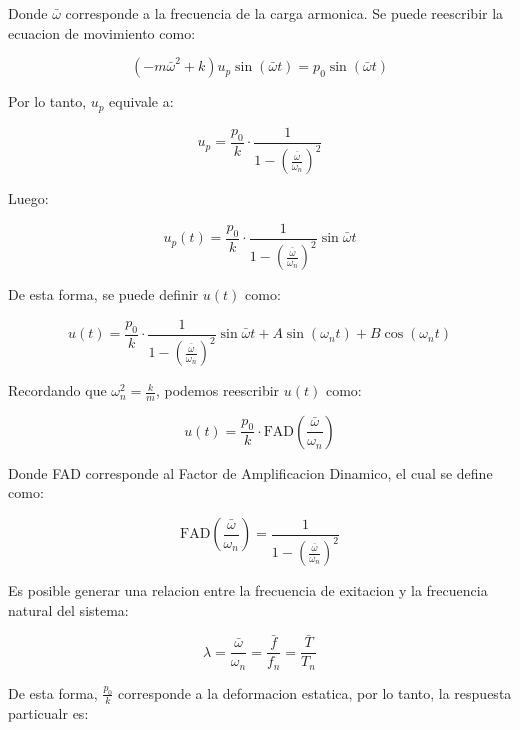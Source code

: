 \documentclass{article}  %
\begin{document}
Donde $\bar{\omega}$ corresponde a la frecuencia de la carga armonica. Se puede reescribir la ecuacion de movimiento como:

\begin{equation}
    (-m \bar{\omega}^2 + k)u_p \sin(\bar{\omega} t ) = p_0 \sin(\bar{\omega} t )
\end{equation}

Por lo tanto, $u_p$ equivale a:

\begin{equation}
    u_p = \frac{p_0}{k} \cdot \frac{1}{1-(\frac{\bar{\omega}}{\omega_n})^2}
\end{equation}

Luego:

\begin{equation}
    u_p(t) = \frac{p_0}{k} \cdot \frac{1}{1-(\frac{\bar{\omega}}{\omega_n})^2} \sin{\bar{\omega} t }
\end{equation}

De esta forma, se puede definir $u(t)$ como:

\begin{equation}
    u(t) = \frac{p_0}{k} \cdot \frac{1}{1-(\frac{\bar{\omega}}{\omega_n})^2} \sin{\bar{\omega} t } + A \sin(\omega_n t) + B \cos(\omega_n t)
\end{equation}

Recordando que $\omega_n^2 = \frac{k}{m}$, podemos reescribir $u(t)$ como:

\begin{equation}
    u(t) = \frac{p_0}{k} \cdot \text{FAD}(\frac{\bar\omega}{\omega_n})
\end{equation}

Donde FAD corresponde al Factor de Amplificacion Dinamico, el cual se define como:

\begin{equation}
    \text{FAD}(\frac{\bar\omega}{\omega_n}) = \frac{1}{1-(\frac{\bar{\omega}}{\omega_n})^2}
\end{equation}

Es posible generar una relacion entre la frecuencia de exitacion y la frecuencia natural del sistema:

\begin{equation}
    \lambda = \frac{\bar{\omega}}{\omega_n} = \frac{\bar{f}}{f_n} = \frac{\bar{T}}{T_n}
\end{equation}

De esta forma, $\frac{p_0}{k}$ corresponde a la deformacion estatica, por lo tanto, la respuesta particualr es:
\end{document}
